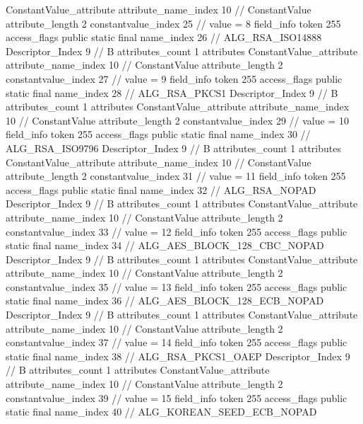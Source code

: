 {{{{{{				ConstantValue_attribute {
					attribute_name_index	10		// ConstantValue
					attribute_length	2
					constantvalue_index	25		// value = 8
				}
				}
			}
			field_info {
				token	255
				access_flags	public static final
				name_index	26		// ALG_RSA_ISO14888
				Descriptor_Index	9		// B
				attributes_count	1
				attributes {
				ConstantValue_attribute {
					attribute_name_index	10		// ConstantValue
					attribute_length	2
					constantvalue_index	27		// value = 9
				}
				}
			}
			field_info {
				token	255
				access_flags	public static final
				name_index	28		// ALG_RSA_PKCS1
				Descriptor_Index	9		// B
				attributes_count	1
				attributes {
				ConstantValue_attribute {
					attribute_name_index	10		// ConstantValue
					attribute_length	2
					constantvalue_index	29		// value = 10
				}
				}
			}
			field_info {
				token	255
				access_flags	public static final
				name_index	30		// ALG_RSA_ISO9796
				Descriptor_Index	9		// B
				attributes_count	1
				attributes {
				ConstantValue_attribute {
					attribute_name_index	10		// ConstantValue
					attribute_length	2
					constantvalue_index	31		// value = 11
				}
				}
			}
			field_info {
				token	255
				access_flags	public static final
				name_index	32		// ALG_RSA_NOPAD
				Descriptor_Index	9		// B
				attributes_count	1
				attributes {
				ConstantValue_attribute {
					attribute_name_index	10		// ConstantValue
					attribute_length	2
					constantvalue_index	33		// value = 12
				}
				}
			}
			field_info {
				token	255
				access_flags	public static final
				name_index	34		// ALG_AES_BLOCK_128_CBC_NOPAD
				Descriptor_Index	9		// B
				attributes_count	1
				attributes {
				ConstantValue_attribute {
					attribute_name_index	10		// ConstantValue
					attribute_length	2
					constantvalue_index	35		// value = 13
				}
				}
			}
			field_info {
				token	255
				access_flags	public static final
				name_index	36		// ALG_AES_BLOCK_128_ECB_NOPAD
				Descriptor_Index	9		// B
				attributes_count	1
				attributes {
				ConstantValue_attribute {
					attribute_name_index	10		// ConstantValue
					attribute_length	2
					constantvalue_index	37		// value = 14
				}
				}
			}
			field_info {
				token	255
				access_flags	public static final
				name_index	38		// ALG_RSA_PKCS1_OAEP
				Descriptor_Index	9		// B
				attributes_count	1
				attributes {
				ConstantValue_attribute {
					attribute_name_index	10		// ConstantValue
					attribute_length	2
					constantvalue_index	39		// value = 15
				}
				}
			}
			field_info {
				token	255
				access_flags	public static final
				name_index	40		// ALG_KOREAN_SEED_ECB_NOPAD
}}}}}
